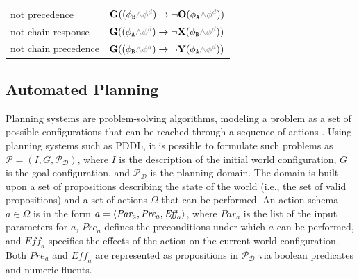 \begin{table}[t!]
{\begin{tabular}{ll}
not precedence & $\lglobally( (\phi_{\texttt{B}} \textcolor{gray}{\wedge \phi^d}) \rightarrow \neg \lonce (\phi_{\texttt{A}} \textcolor{gray}{\wedge \phi^d}))$ \\
not chain response  & $\lglobally( (\phi_{\texttt{A}} \textcolor{gray}{\wedge \phi^d}) \rightarrow \neg \lnext (\phi_{\texttt{B}} \textcolor{gray}{\wedge \phi^d}))$ \\
not chain precedence  & $\lglobally( (\phi_{\texttt{B}} \textcolor{gray}{\wedge \phi^d}) \rightarrow \neg \lyesterday (\phi_{\texttt{A}} \textcolor{gray}{\wedge \phi^d}))$ \\
\bottomrule
\end{tabular}}
\end{table}






\subsection{Automated Planning}\label{ssec:ap}
Planning systems are problem-solving algorithms, modeling a problem as a set of possible configurations that can be reached through a sequence of actions \cite{APlan}. Using planning systems such as PDDL, it is possible to formulate such problems as $\mathcal{P}=(I,G,\mathcal{P}_\mathcal
{D})$, where $I$ is the description of the initial world configuration, $G$ is the goal configuration, and $\mathcal{P}_\mathcal{D}$ is the planning domain. The domain is built upon a set of propositions describing the state of the world (i.e., the set of valid propositions) and a set of actions $\Omega$ that can be performed. An action schema $a\in \Omega$ is in the form $a=\Braket{\textit{Par}_a,\textit{Pre}_a,\textit{Eff}_a}$, where $\textit{Par}_a$ is the list of the input parameters for $a$, $\textit{Pre}_a$ defines the preconditions under which $a$ can be performed, and $\textit{Eff}_a$ specifies the effects of the action on the current world configuration. Both $\textit{Pre}_a$ and $\textit{Eff}_a$ are represented as propositions in $\mathcal{P}_\mathcal{D}$ via boolean predicates and numeric fluents.

